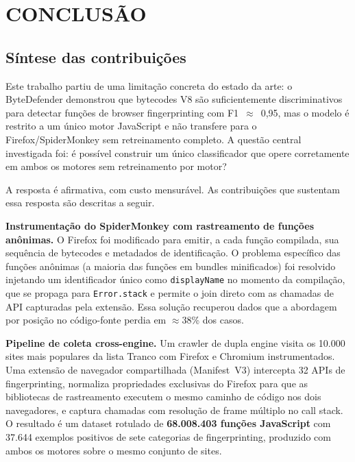 \chapter{CONCLUSÃO}
\label{cap:conclusao}

\section{Síntese das contribuições}
\label{sec:conclusao-contrib}

Este trabalho partiu de uma limitação concreta do estado da arte: o ByteDefender
\cite{nikkhahbahrami2025} demonstrou que bytecodes V8 são suficientemente
discriminativos para detectar funções de browser fingerprinting com
F1~$\approx$~0,95, mas o modelo é restrito a um único motor JavaScript e não
transfere para o Firefox/SpiderMonkey sem retreinamento completo. A questão central
investigada foi: é possível construir um único classificador que opere corretamente
em ambos os motores sem retreinamento por motor?

A resposta é afirmativa, com custo mensurável. As contribuições que sustentam essa
resposta são descritas a seguir.

\textbf{Instrumentação do SpiderMonkey com rastreamento de funções anônimas.} O
Firefox foi modificado para emitir, a cada função compilada, sua sequência de
bytecodes e metadados de identificação. O problema específico das funções anônimas
(a maioria das funções em bundles minificados) foi resolvido injetando
um identificador único como \texttt{displayName} no momento da compilação, que se
propaga para \texttt{Error.stack} e permite o join direto com as chamadas de
API capturadas pela extensão. Essa solução recuperou dados que a abordagem por
posição no código-fonte perdia em $\approx$38\% dos casos.

\textbf{Pipeline de coleta cross-engine.} Um crawler de dupla engine visita
os 10.000 sites mais populares da lista Tranco com Firefox e Chromium
instrumentados. Uma extensão de navegador compartilhada (Manifest~V3) intercepta 32
APIs de fingerprinting, normaliza propriedades exclusivas do Firefox para que
as bibliotecas de rastreamento executem o mesmo caminho de código nos dois
navegadores, e captura chamadas com resolução de frame múltiplo no call
stack. O resultado é um dataset rotulado de \textbf{68.008.403 funções JavaScript}
com 37.644 exemplos positivos de sete categorias de fingerprinting, produzido
com ambos os motores sobre o mesmo conjunto de sites.

